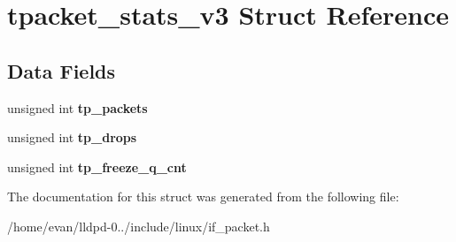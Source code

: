\section{tpacket\-\_\-stats\-\_\-v3 \-Struct \-Reference}
\label{structtpacket__stats__v3}
\subsection*{\-Data \-Fields}
\begin{DoxyCompactItemize}
\item 
unsigned int {\bfseries tp\-\_\-packets}\label{structtpacket__stats__v3_abc49cf53bec1d6e76abade861fbb1c53}

\item 
unsigned int {\bfseries tp\-\_\-drops}\label{structtpacket__stats__v3_a06956dcd8348161b2e9a0e9291a3115d}

\item 
unsigned int {\bfseries tp\-\_\-freeze\-\_\-q\-\_\-cnt}\label{structtpacket__stats__v3_aee67b094ec6743338da7ee3c357d142f}

\end{DoxyCompactItemize}


\-The documentation for this struct was generated from the following file\-:\begin{DoxyCompactItemize}
\item 
/home/evan/lldpd-\/0../include/linux/if\-\_\-packet.\-h\end{DoxyCompactItemize}
